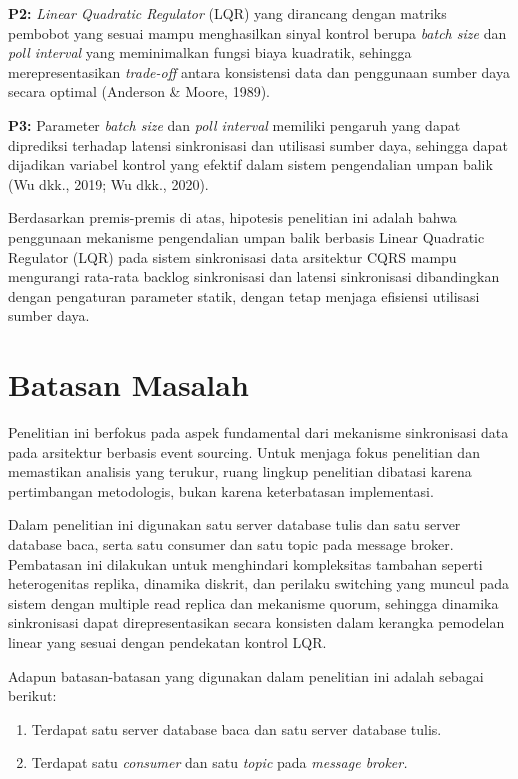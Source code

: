 \noindent \textbf{P2:} \emph{Linear Quadratic Regulator} (LQR) yang dirancang dengan matriks pembobot yang sesuai mampu menghasilkan sinyal kontrol berupa \emph{batch size} dan \emph{poll interval} yang meminimalkan fungsi biaya kuadratik, sehingga merepresentasikan \emph{trade-off} antara konsistensi data dan penggunaan sumber daya secara optimal (Anderson \& Moore, 1989).

\noindent \textbf{P3:} Parameter \emph{batch size} dan \emph{poll interval} memiliki pengaruh yang dapat diprediksi terhadap latensi sinkronisasi dan utilisasi sumber daya, sehingga dapat dijadikan variabel kontrol yang efektif dalam sistem pengendalian umpan balik (Wu dkk., 2019; Wu dkk., 2020).

Berdasarkan premis-premis di atas, hipotesis penelitian ini adalah bahwa penggunaan mekanisme pengendalian umpan balik berbasis Linear Quadratic Regulator (LQR) pada sistem sinkronisasi data arsitektur CQRS mampu mengurangi rata-rata backlog sinkronisasi dan latensi sinkronisasi dibandingkan dengan pengaturan parameter statik, dengan tetap menjaga efisiensi utilisasi sumber daya.

\section{Batasan Masalah}

Penelitian ini berfokus pada aspek fundamental dari mekanisme sinkronisasi data pada arsitektur berbasis event sourcing.
Untuk menjaga fokus penelitian dan memastikan analisis yang terukur, ruang lingkup penelitian dibatasi karena pertimbangan metodologis, bukan karena keterbatasan implementasi.

Dalam penelitian ini digunakan satu server database tulis dan satu server database baca, serta satu consumer dan satu topic pada message broker.
Pembatasan ini dilakukan untuk menghindari kompleksitas tambahan seperti heterogenitas replika, dinamika diskrit, dan perilaku switching yang muncul pada sistem dengan multiple read replica dan mekanisme quorum, sehingga dinamika sinkronisasi dapat direpresentasikan secara konsisten dalam kerangka pemodelan linear yang sesuai dengan pendekatan kontrol LQR.

Adapun batasan-batasan yang digunakan dalam penelitian ini adalah sebagai berikut:

\begin{enumerate}
\item Terdapat satu server database baca dan satu server database tulis.
\item Terdapat satu \emph{consumer} dan satu \emph{topic} pada \emph{message broker.}
\end{enumerate}

